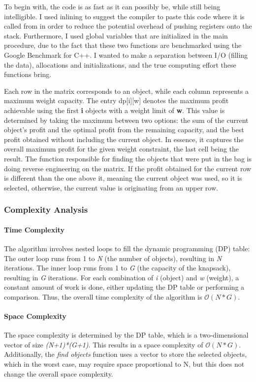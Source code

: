 \documentclass[runningheads]{llncs}
\begin{document}
To begin with, the code is as fast as it can possibly be, while still being intelligible. I used inlining
to suggest the compiler to paste this code where it is called from in order to reduce the potential overhead
of pushing registers onto the stack. Furthermore, I used global variables that are initialized in the main
procedure, due to the fact that these two functions are benchmarked using the Google Benchmark for C++. I
wanted to make a separation between I/O (filling the data), allocations and initializations, and the true
computing effort these functions bring.

Each row in the matrix corresponds to an object, while each column represents a maximum weight capacity.
The entry dp[i][w] denotes the maximum profit achievable using the first \textbf{i} objects with a weight
limit of \textbf{w}. This value is determined by taking the maximum between two options: the sum of the
current object's profit and the optimal profit from the remaining capacity, and the best profit obtained
without including the current object. In essence, it captures the overall maximum profit for the given weight
constraint, the last cell being the result. The function responsible for finding the objects that were put
in the bag is doing reverse engineering on the matrix. If the profit obtained for the current row is different
than the one above it, meaning the current object was used, so it is selected, otherwise, the current value
is originating from an upper row.


\subsubsection{Complexity Analysis}
\paragraph{Time Complexity}
The algorithm involves nested loops to fill the dynamic programming (DP) table:
The outer loop runs from 1 to \textit{N} (the number of objects), resulting in \textit{N} iterations.
The inner loop runs from 1 to \textit{G} (the capacity of the knapsack), resulting in \textit{G} 
iterations. For each combination of \textit{i} (object) and \textit{w} (weight), a constant amount
of work is done, either updating the DP table or performing a comparison. Thus, the overall time
complexity of the algorithm is $\mathcal{O}(N*G)$.

\paragraph{Space Complexity}
The space complexity is determined by the DP table, which is a two-dimensional vector of size 
\textit{(N+1)*(G+1)}. This results in a space complexity of $\mathcal{O}(N*G)$.
Additionally, the \textit{find objects} function uses a vector to store the selected objects, which 
in the worst case, may require space proportional to N, but this does not change the overall space 
complexity.
\end{document}
